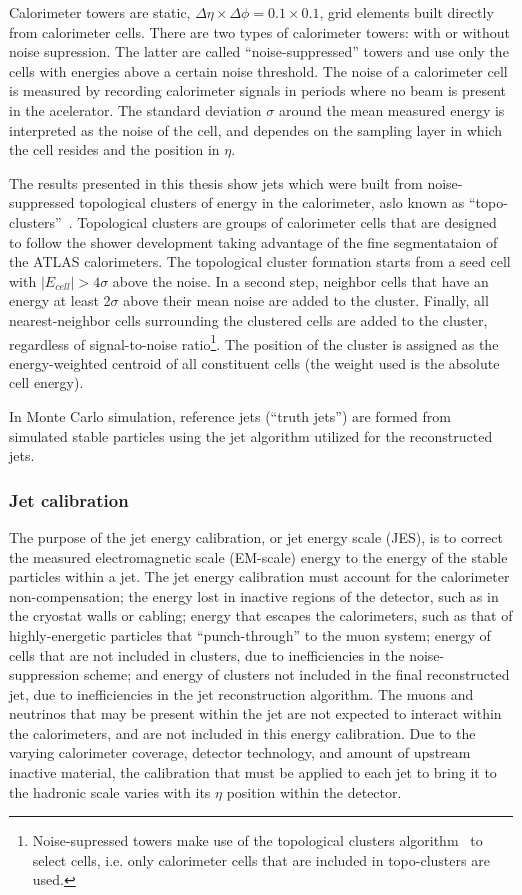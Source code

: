 Calorimeter towers are static, $\Delta \eta \times \Delta \phi = 0.1 \times 0.1$, grid elements built directly from calorimeter cells. There are two types of calorimeter towers: with or without noise supression. The latter are called ``noise-suppressed'' towers and use only the cells with energies above a certain noise threshold.  The noise of a calorimeter cell is measured by recording calorimeter signals in periods where no beam is present in the acelerator.  The standard deviation $\sigma$ around the mean measured energy is interpreted as the noise of the cell, and dependes on the sampling layer in which the cell resides and the position in $\eta$.

The results presented in this thesis show jets which were built from noise-suppressed topological clusters of energy in the calorimeter, aslo known as ``topo-clusters''~\cite{topoClusters}. Topological clusters are groups of calorimeter cells that are designed to follow the shower development taking advantage of the fine segmentataion of the ATLAS calorimeters. The topological cluster formation starts from a seed cell with $|E_{cell}| > 4 \sigma$ above the noise. In a second step, neighbor cells that have an energy at least 2$\sigma$ above their mean noise are added to the cluster. Finally, all nearest-neighbor cells surrounding the clustered cells are added to the cluster, regardless of signal-to-noise ratio\footnote{Noise-supressed towers make use of the topological clusters algorithm~\cite{topoClusters} to select cells, i.e. only calorimeter cells that are included in topo-clusters are used.}. The position of the cluster is assigned as the energy-weighted centroid of all constituent cells (the weight used is the absolute cell energy).

In Monte Carlo simulation, reference jets (``truth jets'') are formed from simulated stable particles using the jet algorithm utilized for the reconstructed jets. 

\subsubsection{Jet calibration}

The purpose of the jet energy calibration, or jet energy scale (JES), is to correct the measured electromagnetic scale (EM-scale) energy to the energy of the stable particles within a jet.  The jet energy calibration must account for the calorimeter non-compensation; the energy lost in inactive regions of the detector, such as in the cryostat walls or cabling; energy that escapes the calorimeters, such as that of highly-energetic particles that “punch-through” to the muon system; energy of cells that are not included in clusters, due to inefficiencies in the noise-suppression scheme; and energy of clusters not included in the final reconstructed jet, due to inefficiencies in the jet reconstruction algorithm. The muons and neutrinos that may be present within the jet are not expected to interact within the calorimeters, and are not included in this energy calibration.
Due to the varying calorimeter coverage, detector technology, and amount of upstream inactive material, the calibration that must be applied to each jet to bring it to the hadronic scale varies with its $\eta$ position within the detector. 

